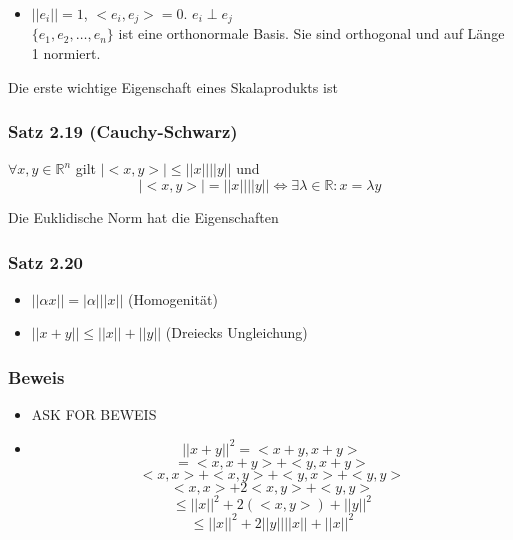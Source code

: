 \begin{framed}
\begin{itemize}
\begin{center}
\begin{tikzpicture}[scale=1,smooth,
                        line cap=round,line join=round]
    \end{tikzpicture}
\end{center}

    \item $\left|\left|e_i\right|\right|=1$, $<e_i,e_j>=0$. $e_i \perp e_j$\\
$\{e_1,e_2,\dots,e_n\}$ ist eine orthonormale Basis. Sie sind orthogonal und auf Länge 1 normiert.
\end{itemize}
\end{framed}
Die erste wichtige Eigenschaft eines Skalaprodukts ist
\subsubsection*{Satz 2.19 (Cauchy-Schwarz)}
$\forall x,y\in\mathbb{R}^n$ gilt $\left| <x,y>\right| \leq \left|\left| x\right|\right| \left|\left| y\right|\right|$ und $$\left| <x,y>\right|=\left|\left| x\right|\right| \left|\left| y\right|\right|\Leftrightarrow \exists\lambda\in\mathbb{R}: x=\lambda y$$

Die Euklidische Norm hat die Eigenschaften
\subsubsection*{Satz 2.20}
\begin{itemize}
    \item $\left|\left| \alpha x\right|\right|=\left|\alpha\right|\left|\left| x\right|\right|$ (Homogenität)
    \item $\left|\left| x+y\right|\right| \leq \left|\left| x\right|\right| + \left|\left| y\right|\right|$ (Dreiecks Ungleichung)
\end{itemize}

\subsubsection*{Beweis}
\begin{itemize}
    \item ASK FOR BEWEIS 
    \item $${\left|\left| x+y\right|\right|}^2=<x+y,x+y>$$
$$=<x,x+y>+<y,x+y>$$
$$<x,x>+<x,y>+<y,x>+<y,y>$$
$$<x,x>+2<x,y>+<y,y>$$
$$\leq {\left|\left| x \right|\right|}^2 + 2\left( <x,y>\right) + {\left|\left| y \right|\right|}^2$$
$$\leq {\left|\left| x \right|\right|}^2 + 2{\left|\left| y \right|\right|}  {\left|\left| x \right|\right|} + {\left|\left| x \right|\right|}^2$$
\end{itemize}

